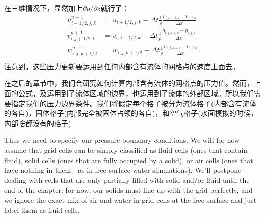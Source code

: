 \documentclass{article}
\begin{document}
在三维情况下，显然加上$\partial{p}/\partial{z}$就行了：
\begin{equation}
\begin{aligned}
u_{i+1/2,j,k}^{n+1}&=u_{i+1/2,j,k}-\Delta{t}\frac{1}{\rho}\frac{p_{i+1,j,k}-p_{i,j,k}}{\Delta{x}} \\
v_{i,j+1/2,k}^{n+1}&=v_{i,j+1/2,k}-\Delta{t}\frac{1}{\rho}\frac{p_{i,j+1,k}-p_{i,j,k}}{\Delta{x}} \\
w_{i,j,k+1/2}^{n+1}&=w_{i,j,k+1/2}-\Delta{t}\frac{1}{\rho}\frac{p_{i,j,k+1}-p_{i,j,k}}{\Delta{x}} \\
\end{aligned}
\end{equation}
注意到，这些压力更新要运用到任何内部含有流体的网格点的速度上面去。
\par
在之后的章节中，我们会研究如何计算内部含有流体的网格点的压力值。然而，上面的公式，及运用到了流体区域的边界，也运用到了流体的外部区域。所以我们需要指定我们的压力边界条件。我们将假定每个格子被分为流体格子(内部含有流体的各自)，固体格子(内部完全被固体占领的各自)，和空气格子(水面模拟的时候，内部啥都没有的格子)

 Thus we need to specify our pressure boundary conditions. We will for now assume that grid cells
can be simply classified as fluid cells (ones that contain fluid), solid cells (ones that are fully occupied by a solid),
or air cells (ones that have nothing in them—as in free surface water simulations). We’ll postpone dealing with cells
that are only partially filled with solid and/or fluid until the end of the chapter: for now, our solids must line up with
the grid perfectly, and we ignore the exact mix of air and water in grid cells at the free surface and just label them as
fluid cells.
\end{document}
